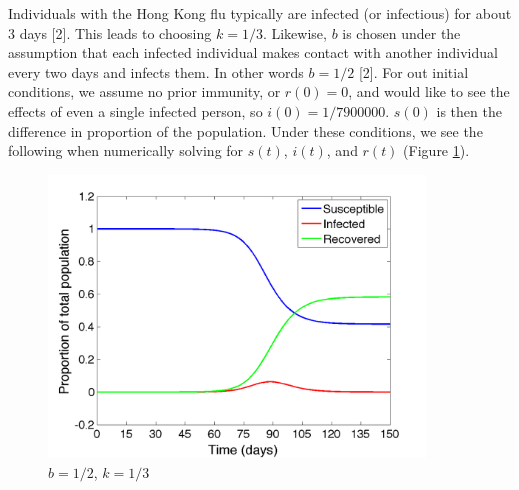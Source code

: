 \documentclass{article}
\begin{document}
Individuals with the Hong Kong flu typically are infected (or infectious) for about 3 days [2].  This leads to choosing $k=1/3$.  Likewise, $b$ is chosen under the assumption that each infected individual makes contact with another individual every two days and infects them. In other words $b=1/2$ [2]. For out initial conditions, we assume no prior immunity, or $r(0)=0$, and would like to see the effects of even a single infected person, so $i(0)=1/7900000$.  $s(0)$ is then the difference in proportion of the population.  Under these conditions, we see the following when numerically solving for $s(t)$, $i(t)$, and $r(t)$ (Figure \ref{basicSol}).  
\begin{figure}[h!]
\centering
\includegraphics[width=10cm]{b05k033333.png}
\caption{$b=1/2$, $k=1/3$}
\label{basicSol}
\end{figure}
\end{document}
